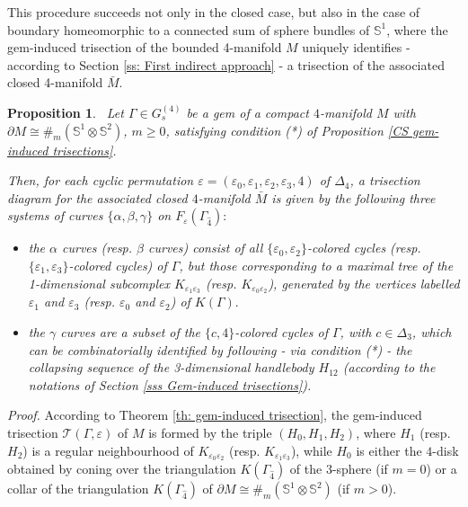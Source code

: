 \documentclass[12pt,a4paper]{article}
\newtheorem{proposition}[lemma]{Proposition}
\newcommand{\dimo}{\noindent \emph{Proof. }}
\newcommand{\e}{\varepsilon}
\begin{document}
This procedure succeeds not only in the closed case, but also in the case of boundary homeomorphic to a connected sum of sphere bundles of $\mathbb S^1$,  where the gem-induced trisection of the bounded 4-manifold $M$ uniquely identifies - according to Section \ref{ss: First indirect approach} - a trisection of the associated closed 4-manifold $\bar M$. 


\medskip


\begin{proposition} \label{trisection_diagrams_gem-induced} \ Let $\Gamma\in G_s^{(4)}$ be a gem of a compact $4$-manifold $M$ with $\partial M \cong \#_m(\mathbb S^1 \otimes \mathbb S^2)$,
$m \ge 0$, satisfying condition (*) of Proposition \ref{CS gem-induced trisections}. 

Then, for each cyclic permutation $\varepsilon=(\e_0,\e_1, \e_2, \e_3, 4)$ of $\Delta_4$, a trisection diagram for the associated closed $4$-manifold $\bar M$ 
is given by the following three systems of curves $\{ \alpha, \beta, \gamma\}$ on 
$F_\e(\Gamma_{\hat 4}):$   
\begin{itemize}
\item[-] the $\alpha$ curves (resp. $\beta$ curves) consist of all $\{\e_0,\e_2\}$-colored cycles (resp. $\{\e_1,\e_3\}$-colored cycles) of $\Gamma$, but those corresponding to a maximal tree of the 1-dimensional subcomplex $K_{\e_1 \e_3}$ (resp. $K_{\e_0 \e_2}$), generated by the vertices labelled $\e_1$ and $\e_3$ (resp. $\e_0$ and $\e_2$) of $K(\Gamma).$    
\item[-] the $\gamma$ curves are a subset of the $\{c,4\}$-colored cycles of $\Gamma$, with $c \in \Delta_3$, which can be combinatorially identified by following - via condition (*) - the collapsing sequence of the 3-dimensional handlebody $H_{12}$ (according to the notations of Section \ref{sss Gem-induced trisections}). 
\end{itemize} 
\end{proposition} 

\dimo
According to Theorem \ref{th: gem-induced trisection}, the gem-induced trisection $\mathcal  T(\Gamma, \varepsilon)$ of 
$M$ is formed by the triple $(H_{0},H_{1},H_{2})$, where $H_{1}$ (resp. $H_{2}$) is a regular neighbourhood of $K_{\e_0 \e_2}$ (resp. $K_{\e_1 \e_3}$), while  $H_{0}$ is either the $4$-disk obtained by coning over the triangulation $K(\Gamma_{\hat 4})$ of the $3$-sphere (if $m=0$) or a collar of the triangulation $K(\Gamma_{\hat 4})$ of $\partial M \cong \#_m(\mathbb S^1 \otimes \mathbb S^2)$ (if $m>0$). 
\end{document}
